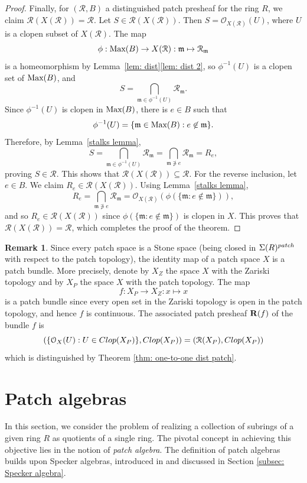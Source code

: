 \documentclass[11pt]{amsart}
\def\m{{\mathfrak m}} %
\def\O{{\mathcal{O}}}
\theoremstyle{definition}
\newtheorem{remark}[theorem]{Remark}
\def\Max{\mbox{\rm Max}}
\def\cal{\mathcal}
\begin{document}
\begin{proof}
Finally, for $({\cal R}, B)$ a distinguished patch presheaf for the ring $R$, we claim ${\cal R}(X(\cal R)) = {\cal R}$.  Let $S \in {\cal R}(X(\cal R))$. Then $S = \O_{X({\cal R})}(U)$,  where $U$ is a clopen subset of $X({\cal R})$. The map $$\phi:\Max(B) \rightarrow X({\mathcal R}):{\mathfrak{m}} \mapsto {\mathcal{R}}_\m$$ is a homeomorphism by Lemma~\ref{lem: dist}\ref{lem: dist 2}, so $\phi^{-1}(U)$ is a clopen set of $\Max(B)$, and $$S = 
\bigcap_{\m \in \phi^{-1}(U)}{\cal R}_{\m}.$$ 
Since $\phi^{-1}(U)$ is clopen in $\Max(B)$, there is $e \in B$ such that $$\phi^{-1}(U) =\{\m\in \Max(B):e \not \in \m\}.$$ Therefore, by Lemma~\ref{stalks lemma},  $$S = 
\bigcap_{\m \in \phi^{-1}(U)}{\cal R}_{\m}=
\bigcap_{\m \not \ni e}{\cal R}_{\m} = 
R_e,$$ proving $S \in {\cal R}$. This shows that ${\cal R}(X(\cal R)) \subseteq {\cal R}$. For the reverse inclusion, let $e \in B$. We claim $R_e \in {\cal R}(X(\cal R))$. Using Lemma~\ref{stalks lemma}, $$R_e = \bigcap_{\m \not \ni e}{\cal R}_{\m} =  \O_{X({\cal R})}(\phi(\{\m:e \not \in \m\})),$$
and so $R_e \in {\mathcal R}(X(\cal R))$ since $\phi(\{\m:e \not \in \m\})$ is clopen in $X$. This proves that ${\cal R}(X(\cal R)) = {\cal R}$, which completes the proof of the theorem. 
\end{proof}

\begin{remark}\label{rem: patch spaces are bundles}
    Since every patch space is a Stone space (being closed in ${\Sigma}(R)^{\rm patch}$ with respect to the patch topology), the identity map  of a patch space $X$ is a patch bundle. More precisely, denote by $X_Z$ the space $X$ with the Zariski topology and by $X_P$ the space $X$ with the patch topology. The map $$f:X_P \rightarrow X_Z:x \mapsto x$$ is a patch bundle since every open set in the Zariski topology is open in the patch topology, and hence $f$ is continuous. The associated patch presheaf ${\bf R}(f)$ of the bundle $f$ is $$(\{\O_X(U):U \in {\rm Clop}(X_P)\},{\rm Clop}(X_P)) = ({\mathcal{R}}(X_P),{\rm Clop}(X_P))$$ which is distinguished by Theorem \ref{thm: one-to-one dist patch}.
\end{remark}



\section{Patch algebras} \label{sec: 6 Patch algebras}

  In this section, we consider the problem of realizing a collection of subrings of a given ring $R$ as quotients of a single ring. The pivotal concept in achieving this objective lies in the notion of {\it patch algebra}. The definition of patch algebras builds upon Specker algebras, introduced in \cite{BMO} and discussed in Section \ref{subsec: Specker algebra}.
\end{document}
